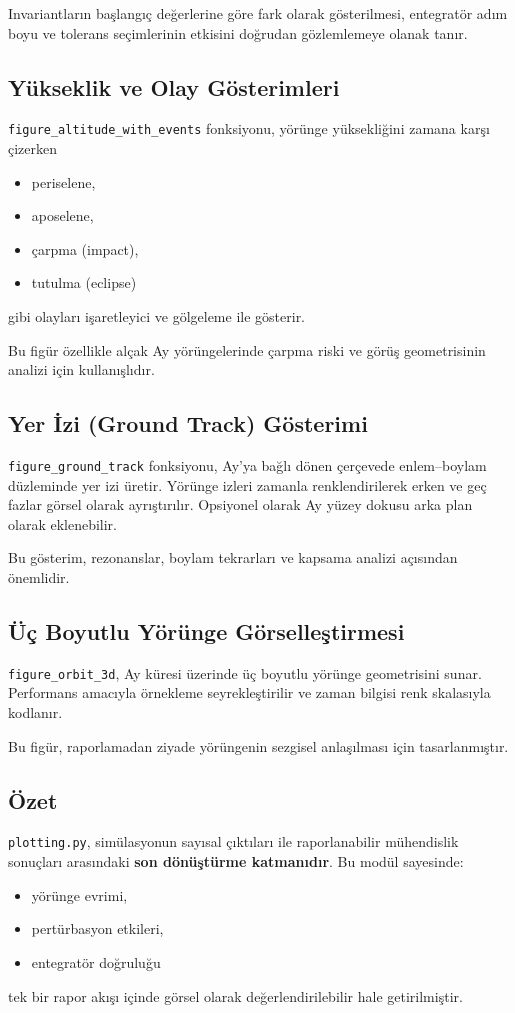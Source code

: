 Invariantların başlangıç değerlerine göre fark olarak gösterilmesi,
entegratör adım boyu ve tolerans seçimlerinin
etkisini doğrudan gözlemlemeye olanak tanır.

\subsection*{Yükseklik ve Olay Gösterimleri}
\texttt{figure\_altitude\_with\_events} fonksiyonu,
yörünge yüksekliğini zamana karşı çizerken
\begin{itemize}
  \item periselene,
  \item aposelene,
  \item çarpma (impact),
  \item tutulma (eclipse)
\end{itemize}
gibi olayları işaretleyici ve gölgeleme ile gösterir.

Bu figür özellikle alçak Ay yörüngelerinde
çarpma riski ve görüş geometrisinin analizi için kullanışlıdır.

\subsection*{Yer İzi (Ground Track) Gösterimi}
\texttt{figure\_ground\_track} fonksiyonu,
Ay’ya bağlı dönen çerçevede
enlem–boylam düzleminde yer izi üretir.
Yörünge izleri zamanla renklendirilerek
erken ve geç fazlar görsel olarak ayrıştırılır.
Opsiyonel olarak Ay yüzey dokusu arka plan olarak eklenebilir.

Bu gösterim, rezonanslar, boylam tekrarları
ve kapsama analizi açısından önemlidir.

\subsection*{Üç Boyutlu Yörünge Görselleştirmesi}
\texttt{figure\_orbit\_3d}, Ay küresi üzerinde
üç boyutlu yörünge geometrisini sunar.
Performans amacıyla örnekleme seyrekleştirilir
ve zaman bilgisi renk skalasıyla kodlanır.

Bu figür,
raporlamadan ziyade
yörüngenin sezgisel anlaşılması için tasarlanmıştır.

\subsection*{Özet}
\texttt{plotting.py}, simülasyonun sayısal çıktıları ile
raporlanabilir mühendislik sonuçları arasındaki
\textbf{son dönüştürme katmanıdır}.
Bu modül sayesinde:
\begin{itemize}
  \item yörünge evrimi,
  \item pertürbasyon etkileri,
  \item entegratör doğruluğu
\end{itemize}
tek bir rapor akışı içinde
görsel olarak değerlendirilebilir hale getirilmiştir.



